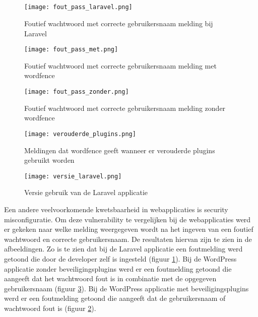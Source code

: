 \subsection{}
\begin{figure}
    \centering
    \texttt{[image: fout\_pass\_laravel.png]}
    \caption[Foutief wachtwoord met correcte gebruikersnaam melding bij Laravel]{Foutief wachtwoord met correcte gebruikersnaam melding bij Laravel}
    \label{fig:sec_mis_laravel}
\end{figure}
\begin{figure}
    \centering
    \texttt{[image: fout\_pass\_met.png]}
    \caption[Foutief wachtwoord met correcte gebruikersnaam melding met wordfence]{Foutief wachtwoord met correcte gebruikersnaam melding met wordfence}
    \label{fig:sec_mis_met}
\end{figure}
\begin{figure}
    \centering
    \texttt{[image: fout\_pass\_zonder.png]}
    \caption[Foutief wachtwoord met correcte gebruikersnaam melding zonder wordefence]{Foutief wachtwoord met correcte gebruikersnaam melding zonder wordfence}
    \label{fig:sec_mis_zonder}
\end{figure}
\begin{figure}
    \centering
    \texttt{[image: verouderde\_plugins.png]}
    \caption[Meldingen dat wordfence geeft wanneer er verouderde plugins gebruikt worden]{Meldingen dat wordfence geeft wanneer er verouderde plugins gebruikt worden}
    \label{fig:verouderde_plugins}
\end{figure}
\begin{figure}
    \centering
    \texttt{[image: versie\_laravel.png]}
    \caption[Versie gebruik van de Laravel applicatie]{Versie gebruik van de Laravel applicatie}
    \label{fig:versie_laravel}
\end{figure}
Een andere veelvoorkomende kwetsbaarheid in webapplicaties is security misconfiguratie. Om deze vulnerability te vergelijken 
bij de webapplicaties werd er gekeken naar welke melding weergegeven wordt na het ingeven van een foutief wachtwoord
en correcte gebruikersnaam. De resultaten hiervan zijn te zien in de afbeeldingen. Zo is te zien dat bij de Laravel 
applicatie een foutmelding werd getoond die door de developer zelf is ingesteld (figuur \ref{fig:sec_mis_laravel}). Bij de WordPress 
applicatie zonder beveiligingsplugins werd er een foutmelding getoond die aangeeft dat het wachtwoord fout is in combinatie 
met de opgegeven gebruikersnaam (figuur \ref{fig:sec_mis_zonder}). Bij de WordPress applicatie met beveiligingsplugins werd er een 
foutmelding getoond die aangeeft dat de gebruikersnaam of wachtwoord fout is (figuur \ref{fig:sec_mis_met}).

